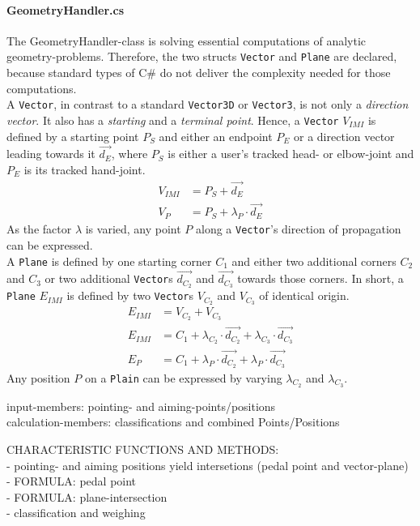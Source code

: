 \paragraph{GeometryHandler.cs} The GeometryHandler-class is solving essential computations of analytic geometry-problems. Therefore, the two structs \texttt{Vector} and \texttt{Plane} are declared, because standard types of C$\#$ do not deliver the complexity needed for those computations.
\\
A \texttt{Vector}, in contrast to a standard \texttt{Vector3D} or \texttt{Vector3}, is not only a \textit{direction vector}. It also has a \textit{starting} and a \textit{terminal point}. Hence, a \texttt{Vector} $V_{IMI}$ is defined by a starting point $P_{S}$ and either an endpoint $P_{E}$ or a direction vector leading towards it $\overrightarrow{d_{E}}$, where $P_{S}$ is either a user's tracked head- or elbow-joint and $P_{E}$ is its tracked hand-joint. 
\begin{align*}
	V_{IMI} &= P_{S} + \overrightarrow{d_{E}} \\
	V_{P} &= P_{S} + \lambda_{P} \cdot \overrightarrow{d_{E}}
\end{align*}
As the factor $\lambda$ is varied, any point $P$ along a \texttt{Vector}'s direction of propagation can be expressed. 
\\
A \texttt{Plane} is defined by one starting corner $C_{1}$ and either two additional corners $C_{2}$ and $C_{3}$ or two additional \texttt{Vector}s $\overrightarrow{d_{C_{2}}}$ and $\overrightarrow{d_{C_{3}}}$ towards those corners. In short, a \texttt{Plane} $E_{IMI}$ is defined by two \texttt{Vector}s $V_{C_{2}}$ and $V_{C_{3}}$ of identical origin.  
\begin{align*}
	E_{IMI} &= V_{C_{2}} + V_{C_{3}} \\
	E_{IMI} &= C_{1} + \lambda_{C_{2}} \cdot \overrightarrow{d_{C_{2}}} + \lambda_{C_{3}} \cdot \overrightarrow{d_{C_{3}}} \\
	E_{P} &= C_{1} + \lambda_{P} \cdot \overrightarrow{d_{C_{2}}} + \lambda_{P} \cdot \overrightarrow{d_{C_{3}}}
\end{align*}
Any position $P$ on a \texttt{Plain} can be expressed by varying $\lambda_{C_{2}}$ and $\lambda_{C_{3}}$.

input-members: pointing- and aiming-points/positions
\\
calculation-members: classifications and combined Points/Positions

CHARACTERISTIC FUNCTIONS AND METHODS: 
\\- pointing- and aiming positions yield intersetions (pedal point and vector-plane) 
\\- FORMULA: pedal point
\\- FORMULA: plane-intersection
\\- classification and weighing

